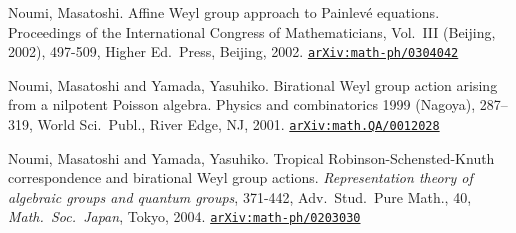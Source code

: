 \documentclass[12pt,twoside,dvipdfm]{msjproc}
\newcommand\arxivref[1]{\href{http://arxiv.org/abs/#1}{\tt arXiv:#1}}
\theoremstyle{definition} %
\theoremstyle{definition} %
\theoremstyle{definition} %
\numberwithin{theorem}{section}
\numberwithin{equation}{section}
\numberwithin{figure}{section}
\numberwithin{table}{section}
\begin{document}
\begin{thebibliography}{99}
Noumi, Masatoshi.
Affine Weyl group approach to Painlev\'e equations.
Proceedings of the International Congress of Mathematicians, 
Vol.~III (Beijing, 2002), 497-509, Higher Ed.\ Press, Beijing, 2002. 
\arxivref{math-ph/0304042}

Noumi, Masatoshi and Yamada, Yasuhiko.
Birational Weyl group action arising from a nilpotent Poisson algebra. 
Physics and combinatorics 1999 (Nagoya), 287--319, 
World Sci.\ Publ., River Edge, NJ, 2001. 
\arxivref{math.QA/0012028}

Noumi, Masatoshi and Yamada, Yasuhiko.
Tropical Robinson-Schensted-Knuth correspondence and birational Weyl group actions. 
{\em Representation theory of algebraic groups and quantum groups}, 371-442,
Adv.\ Stud.\ Pure Math., 40, {\em Math.\ Soc.\ Japan}, Tokyo, 2004. 
\arxivref{math-ph/0203030}

\end{thebibliography}

\end{document}
